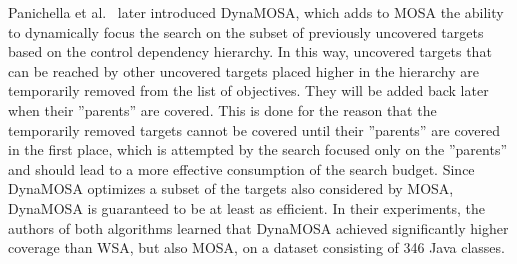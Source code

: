 \documentclass{article}
\begin{document}

Panichella et al.~\cite{Panichella2018} later introduced \ac{DynaMOSA}, which adds to \ac{MOSA} the ability to dynamically focus the search on the subset of previously uncovered targets based on the control dependency hierarchy. In this way, uncovered targets that can be reached by other uncovered targets placed higher in the hierarchy are temporarily removed from the list of objectives. They will be added back later when their ''parents'' are covered. This is done for the reason that the temporarily removed targets cannot be covered until their ''parents'' are covered in the first place, which is attempted by the search focused only on the ''parents'' and should lead to a more effective consumption of the search budget. Since \ac{DynaMOSA} optimizes a subset of the targets also considered by \ac{MOSA}, \ac{DynaMOSA} is guaranteed to be at least as efficient. In their experiments, the authors of both algorithms learned that \ac{DynaMOSA} achieved significantly higher coverage than \ac{WSA}, but also \ac{MOSA}, on a dataset consisting of 346 Java classes. 
\end{document}
